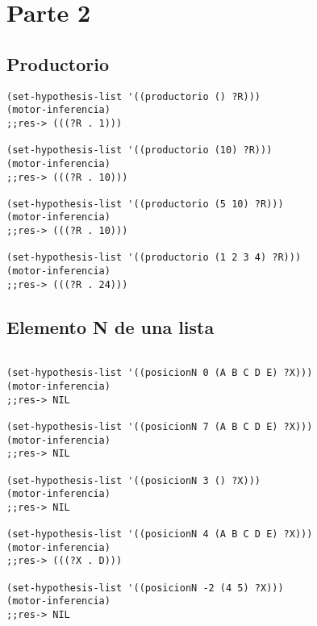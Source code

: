 \documentclass[nochap]{apuntes}
\begin{document}
\section*{Parte 2}


\subsection*{Productorio}
\begin{lstlisting}
(set-hypothesis-list '((productorio () ?R)))
(motor-inferencia)
;;res-> (((?R . 1)))

(set-hypothesis-list '((productorio (10) ?R)))
(motor-inferencia)
;;res-> (((?R . 10)))

(set-hypothesis-list '((productorio (5 10) ?R)))
(motor-inferencia)
;;res-> (((?R . 10)))

(set-hypothesis-list '((productorio (1 2 3 4) ?R)))
(motor-inferencia)
;;res-> (((?R . 24)))
\end{lstlisting}

\subsection*{Elemento N de una lista}

\begin{lstlisting}

(set-hypothesis-list '((posicionN 0 (A B C D E) ?X)))
(motor-inferencia)
;;res-> NIL

(set-hypothesis-list '((posicionN 7 (A B C D E) ?X)))
(motor-inferencia)
;;res-> NIL

(set-hypothesis-list '((posicionN 3 () ?X)))
(motor-inferencia)
;;res-> NIL

(set-hypothesis-list '((posicionN 4 (A B C D E) ?X)))
(motor-inferencia)
;;res-> (((?X . D)))

(set-hypothesis-list '((posicionN -2 (4 5) ?X)))
(motor-inferencia)
;;res-> NIL
\end{lstlisting}
\end{document}
